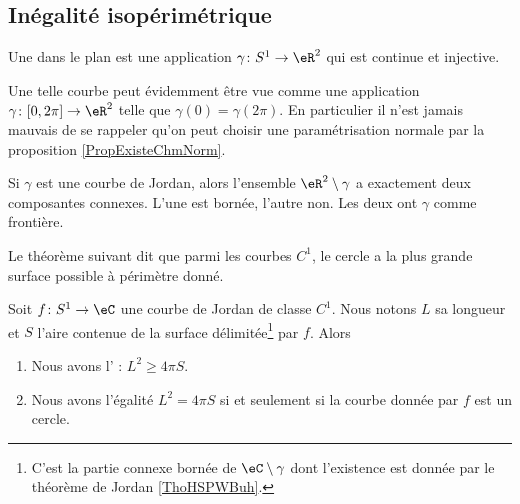 
\subsection{Inégalité isopérimétrique}

\begin{definition}
    Une  dans le plan est une application \( \gamma\colon S^1\to \eR^2\) qui est continue et injective.
\end{definition}
Une telle courbe peut évidemment être vue comme une application \( \gamma\colon \mathopen[ 0 , 2\pi ]\to \eR^2\) telle que \( \gamma(0)=\gamma(2\pi)\). En particulier il n'est jamais mauvais de se rappeler qu'on peut choisir une paramétrisation normale par la proposition \ref{PropExisteChmNorm}.

\begin{theorem}   \label{ThoHSPWBuh}
    Si \( \gamma\) est une courbe de Jordan, alors l'ensemble \( \eR^2\setminus \gamma\) a exactement deux composantes connexes. L'une est bornée, l'autre non. Les deux ont \( \gamma\) comme frontière.
\end{theorem}

Le théorème suivant dit que parmi les courbes \( C^1\), le cercle a la plus grande surface possible à périmètre donné.
\begin{theorem}    \label{ThoIXyctPo}
    Soit \( f\colon S^1\to \eC \) une courbe de Jordan de classe \( C^1\). Nous notons \( L\) sa longueur et \( S\) l'aire contenue de la surface délimitée\footnote{C'est la partie connexe bornée de \( \eC\setminus\gamma\) dont l'existence est donnée par le théorème de Jordan \ref{ThoHSPWBuh}.} par \( f\). Alors
    \begin{enumerate}
        \item
            Nous avons l' : \( L^2\geq 4\pi S\).
        \item
            Nous avons l'égalité \( L^2=4\pi S\) si et seulement si la courbe donnée par \( f\) est un cercle.
    \end{enumerate}
\end{theorem}

